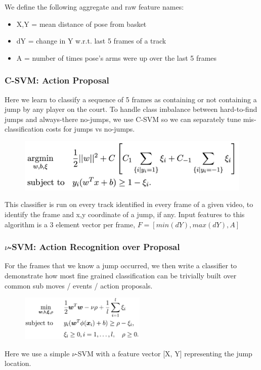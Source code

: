 \documentclass{article}
\begin{document}
We define the following aggregate and raw feature names:
\begin{itemize}
\item X,Y = mean distance of pose from basket
\item dY = change in Y w.r.t. last 5 frames of a track
\item A = number of times pose’s arms were up over the last 5 frames
\end{itemize}

\subsubsection{C-SVM: Action Proposal}
Here we learn to classify a sequence of 5 frames as containing or not containing a jump by any player on the court. To handle class imbalance between hard-to-find jumps and always-there no-jumps, we use C-SVM so we can separately tune mis-classification costs for jumps vs no-jumps.

\begin{figure}[ht]
\vskip -0.05in
\begin{center}
\centerline{\includegraphics[width=\columnwidth]{csvm_equation.png}}
\label{fig:csvm_equation}
\end{center}
\vskip -0.2in
\end{figure}

This classifier is run on every track identified in every frame of a given video, to identify the frame and x,y coordinate of a jump, if any. Input features to this algorithm is a 3 element vector per frame, $F=[min(dY), max(dY), A]$

\subsubsection{$\nu$-SVM: Action Recognition over Proposal}
For the frames that we know a jump occurred, we then write a classifier to demonstrate how most fine grained classification can be trivially built over common sub moves / events / action proposals. 
\begin{figure}[ht]
\vskip -0.05in
\begin{center}
\centerline{\includegraphics[width=6cm]{nusvm_equation.png}}
\label{fig:nusvm_equation}
\end{center}
\vskip -0.2in
\end{figure}
Here we use a simple $\nu$-SVM with a feature vector [X, Y] representing the jump location.
\end{document}
